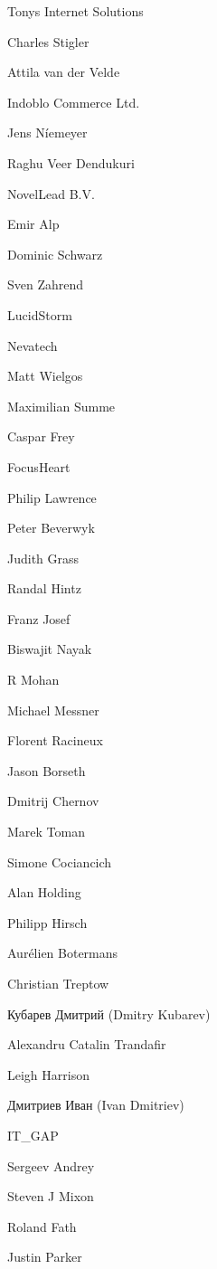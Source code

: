 \begin{DoxyItemize}
\item Tony\textquotesingle{}s Internet Solutions
\item Charles Stigler
\item Attila van der Velde
\item Indoblo Commerce Ltd.
\item Jens Níemeyer
\item Raghu Veer Dendukuri
\item Novel\+Lead B.\+V.
\item Emir Alp
\item Dominic Schwarz
\item Sven Zahrend
\item Lucid\+Storm
\item Nevatech
\item Matt Wielgos
\item Maximilian Summe
\item Caspar Frey
\item Focus\+Heart
\item Philip Lawrence
\item Peter Beverwyk
\item Judith Grass
\item Randal Hintz
\item Franz Josef
\item Biswajit Nayak
\item R Mohan
\item Michael Messner
\item Florent Racineux
\item Jason Borseth
\item Dmitrij Chernov
\item Marek Toman
\item Simone Cociancich
\item Alan Holding
\item Philipp Hirsch
\item Aurélien Botermans
\item Christian Treptow
\item Кубарев Дмитрий (Dmitry Kubarev)
\item Alexandru Catalin Trandafir
\item Leigh Harrison
\item Дмитриев Иван (Ivan Dmitriev)
\item I\+T\+\_\+\+G\+AP
\item Sergeev Andrey
\item Steven J Mixon
\item Roland Fath
\item Justin Parker

\end{DoxyItemize}
